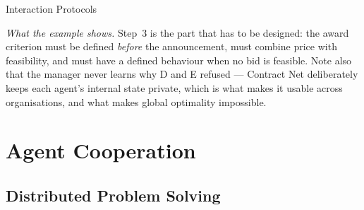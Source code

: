 \begin{v3topic}{Interaction Protocols}
\begin{center}
\begin{workedexample}
\emph{What the example shows.} Step~3 is the part that has to be designed:
the award criterion must be defined \emph{before} the announcement, must
combine price with feasibility, and must have a defined behaviour when no bid
is feasible. Note also that the manager never learns why D and E refused ---
Contract Net deliberately keeps each agent's internal state private, which is
what makes it usable across organisations, and what makes global optimality
impossible.
\end{workedexample}
    \end{center}

\end{v3topic}

\section{Agent Cooperation}

\subsection{Distributed Problem Solving}

